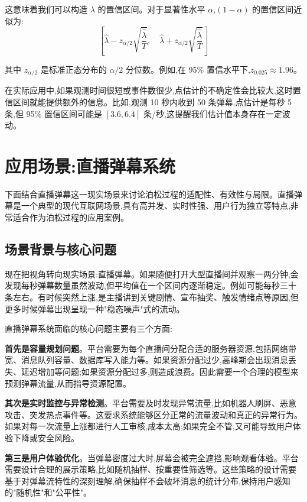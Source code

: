 \documentclass[12pt,a4paper]{article}
\begin{document}
这意味着我们可以构造 $\lambda$ 的置信区间。对于显著性水平 $\alpha$,$(1-\alpha)$ 的置信区间近似为:
\begin{equation}
\left[\hat{\lambda} - z_{\alpha/2}\sqrt{\frac{\hat{\lambda}}{T}}, \quad \hat{\lambda} + z_{\alpha/2}\sqrt{\frac{\hat{\lambda}}{T}}\right]
\end{equation}

其中 $z_{\alpha/2}$ 是标准正态分布的 $\alpha/2$ 分位数。例如,在 95\% 置信水平下,$z_{0.025} \approx 1.96$。

在实际应用中,如果观测时间很短或事件数很少,点估计的不确定性会比较大,这时置信区间就能提供额外的信息。比如,观测 10 秒内收到 50 条弹幕,点估计是每秒 5 条,但 95\% 置信区间可能是 $[3.6, 6.4]$ 条/秒,这提醒我们估计值本身存在一定波动。

\section{应用场景:直播弹幕系统}

下面结合直播弹幕这一现实场景来讨论泊松过程的适配性、有效性与局限。直播弹幕是一个典型的现代互联网场景,具有高并发、实时性强、用户行为独立等特点,非常适合作为泊松过程的应用案例。

\subsection{场景背景与核心问题}

现在把视角转向现实场景:直播弹幕。如果随便打开大型直播间并观察一两分钟,会发现每秒弹幕数量虽然波动,但平均值在一个区间内逐渐稳定。例如可能每秒三十条左右。有时候突然上涨,是主播讲到关键剧情、宣布抽奖、触发情绪点等原因,但更多时候弹幕出现呈现一种"稳态噪声"式的流动。

直播弹幕系统面临的核心问题主要有三个方面:

\textbf{首先是容量规划问题}。平台需要为每个直播间分配合适的服务器资源,包括网络带宽、消息队列容量、数据库写入能力等。如果资源分配过少,高峰期会出现消息丢失、延迟增加等问题;如果资源分配过多,则造成浪费。因此需要一个合理的模型来预测弹幕流量,从而指导资源配置。

\textbf{其次是实时监控与异常检测}。平台需要及时发现异常流量,比如机器人刷屏、恶意攻击、突发热点事件等。这要求系统能够区分正常的流量波动和真正的异常行为。如果对每一次流量上涨都进行人工审核,成本太高;如果完全不管,又可能导致用户体验下降或安全风险。

\textbf{第三是用户体验优化}。当弹幕密度过大时,屏幕会被完全遮挡,影响观看体验。平台需要设计合理的展示策略,比如随机抽样、按重要性筛选等。这些策略的设计需要基于对弹幕流特性的深刻理解,确保抽样不会破坏消息的统计分布,保持用户感知的"随机性"和"公平性"。
\end{document}

